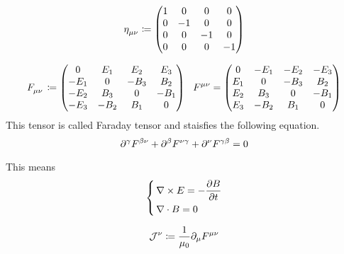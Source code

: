 \documentclass[leqno]{ltjsarticle}
\begin{document}
	\begin{equation}
		\tensor{\eta}{_\mu_\nu} \coloneq
		\begin{pmatrix}
			1 & 0 & 0 & 0\\
			0 & -1 & 0 & 0\\
			0 & 0 & -1 & 0\\
			0 & 0 & 0 & -1
		\end{pmatrix}
	\end{equation}

\begin{equation}
\tensor{F}{_\mu_\nu}\coloneq
	\begin{pmatrix}
		0 & E_1 & E_2 & E_3\\
		-E_1 & 0 & -B_3 & B_2\\
		-E_2 & B_3 & 0 & -B_1\\
		-E_3 & -B_2 & B_1 & 0
	\end{pmatrix}\ \  
\tensor{F}{^\mu^\nu}=
	\begin{pmatrix}
		0 & -E_1 & -E_2 & -E_3\\
		E_1 & 0 & -B_3 & B_2\\
		E_2 & B_3 & 0 & -B_1\\
		E_3 & -B_2 & B_1 & 0
	\end{pmatrix}
\end{equation}
	This tensor is called Faraday tensor and staisfies the following equation.
	\begin{equation}
		\partial^\gamma\tensor{F}{^\beta^\nu} + \partial^\beta\tensor{F}{^\nu^\gamma} + \partial^\nu\tensor{F}{^\gamma^\beta} = 0 
	\end{equation}
	\begin{shadebox}
	This means 
	\begin{equation}
		\left\{\,
			\begin{aligned}
				&\nabla\times E= -\pdv{B}{t} \\
				&\nabla\cdot B = 0
			\end{aligned}
		\right.
	\end{equation}
\end{shadebox}
	
	\begin{equation}
		\mathcal{J}^{\nu} \coloneq \frac{1}{\mu_0}\partial_{\mu}\tensor{F}{^\mu^\nu}
	\end{equation}
\end{document}
